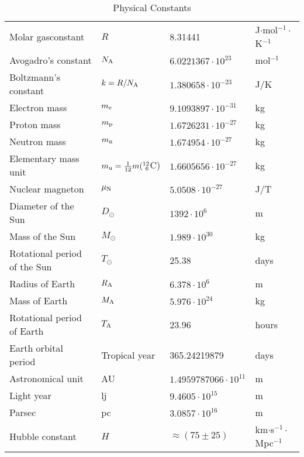 \begin{table}
\begin{tabular}{||l|lll||}
		\hline
		Molar gasconstant            &$R$&8.31441&J$\cdot$mol$^{-1}\cdot$K$^{-1}$\\
		Avogadro's constant          &$N_{\textrm A}$&$6.0221367\cdot10^{23}$&mol$^{-1}$\\
		Boltzmann's constant         &$k=R/N_{\textrm A}$&$1.380658\cdot10^{-23}$&J/K\\
		\hline
		Electron mass                &$m_{\textrm e}$&$9.1093897\cdot10^{-31}$&kg\rule{0pt}{13pt}\\
		Proton mass                  &$m_{\textrm p}$&$1.6726231\cdot10^{-27}$&kg\\
		Neutron mass                 &$m_{\textrm n}$&$1.674954\cdot10^{-27}$&kg\\
		Elementary mass unit         &$m_{\textrm u}=\frac{1}{12}m(^{12}_{~6}$C)&$1.6605656\cdot10^{-27}$&kg\\
		Nuclear magneton             &$\mu_{\textrm N}$&$5.0508\cdot10^{-27}$&J/T\\
		\hline
		Diameter of the Sun          &$D_\odot$&$1392\cdot10^6$&m\rule{0pt}{13pt}\\
		Mass of the Sun              &$M_\odot$&$1.989\cdot10^{30}$&kg\\
		Rotational period of the Sun &$T_\odot$&25.38&days\\
		Radius of Earth              &$R_{\textrm A}$&$6.378\cdot10^6$&m\\
		Mass of Earth                &$M_{\textrm A}$&$5.976\cdot10^{24}$&kg\\
		Rotational period of Earth   &$T_{\textrm A}$&23.96&hours\\
		Earth orbital period         &Tropical year&365.24219879&days\\
		Astronomical unit            &AU&$1.4959787066\cdot10^{11}$&m\\
		Light year                   &lj&$9.4605\cdot10^{15}$&m\\
		Parsec                       &pc&$3.0857\cdot10^{16}$&m\\
		Hubble constant              &$H$&$\approx(75\pm25)$&km$\cdot$s$^{-1}\cdot$Mpc$^{-1}$\\
		\hline
	\end{tabular}
	\caption{Physical Constants}
\end{table}

